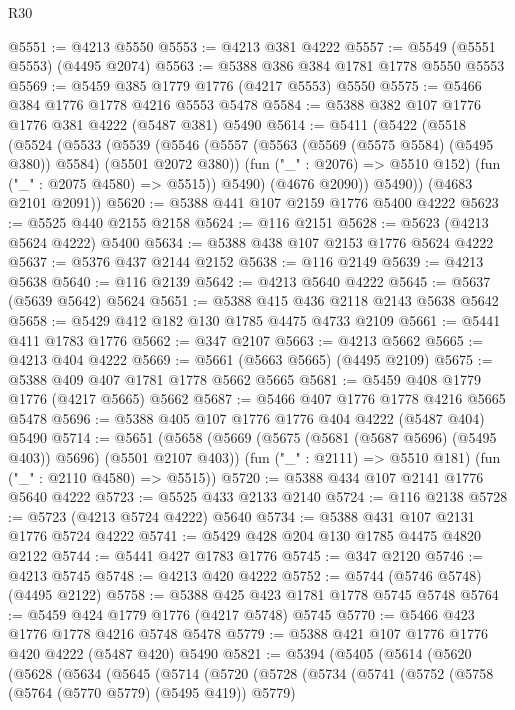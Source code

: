 \begin{lexlean}{R30}
\begin{coremodule}
{{{{{@5551 := @4213 @5550
@5553 := @4213 @381 @4222
@5557 := @5549 (@5551 @5553) (@4495 @2074)
@5563 := @5388 @386 @384 @1781 @1778 @5550 @5553
@5569 := @5459 @385 @1779 @1776 (@4217 @5553) @5550
@5575 := @5466 @384 @1776 @1778 @4216 @5553 @5478
@5584 := @5388 @382 @107 @1776 @1776 @381 @4222 (@5487 @381) @5490
@5614 := @5411
    (@5422
      (@5518
        (@5524
          (@5533
            (@5539
              (@5546
                (@5557 (@5563 (@5569 (@5575 @5584) (@5495 @380)) @5584) (@5501 @2072 @380))
                (fun ("_" : @2076) => @5510 @152)
                (fun ("_" : @2075 @4580) => @5515))
              @5490)
            (@4676 @2090))
          @5490))
      (@4683 @2101 @2091))
@5620 := @5388 @441 @107 @2159 @1776 @5400 @4222
@5623 := @5525 @440 @2155 @2158
@5624 := @116 @2151
@5628 := @5623 (@4213 @5624 @4222) @5400
@5634 := @5388 @438 @107 @2153 @1776 @5624 @4222
@5637 := @5376 @437 @2144 @2152
@5638 := @116 @2149
@5639 := @4213 @5638
@5640 := @116 @2139
@5642 := @4213 @5640 @4222
@5645 := @5637 (@5639 @5642) @5624
@5651 := @5388 @415 @436 @2118 @2143 @5638 @5642
@5658 := @5429 @412 @182 @130 @1785 @4475 @4733 @2109
@5661 := @5441 @411 @1783 @1776
@5662 := @347 @2107
@5663 := @4213 @5662
@5665 := @4213 @404 @4222
@5669 := @5661 (@5663 @5665) (@4495 @2109)
@5675 := @5388 @409 @407 @1781 @1778 @5662 @5665
@5681 := @5459 @408 @1779 @1776 (@4217 @5665) @5662
@5687 := @5466 @407 @1776 @1778 @4216 @5665 @5478
@5696 := @5388 @405 @107 @1776 @1776 @404 @4222 (@5487 @404) @5490
@5714 := @5651
    (@5658
      (@5669 (@5675 (@5681 (@5687 @5696) (@5495 @403)) @5696) (@5501 @2107 @403))
      (fun ("_" : @2111) => @5510 @181)
      (fun ("_" : @2110 @4580) => @5515))
@5720 := @5388 @434 @107 @2141 @1776 @5640 @4222
@5723 := @5525 @433 @2133 @2140
@5724 := @116 @2138
@5728 := @5723 (@4213 @5724 @4222) @5640
@5734 := @5388 @431 @107 @2131 @1776 @5724 @4222
@5741 := @5429 @428 @204 @130 @1785 @4475 @4820 @2122
@5744 := @5441 @427 @1783 @1776
@5745 := @347 @2120
@5746 := @4213 @5745
@5748 := @4213 @420 @4222
@5752 := @5744 (@5746 @5748) (@4495 @2122)
@5758 := @5388 @425 @423 @1781 @1778 @5745 @5748
@5764 := @5459 @424 @1779 @1776 (@4217 @5748) @5745
@5770 := @5466 @423 @1776 @1778 @4216 @5748 @5478
@5779 := @5388 @421 @107 @1776 @1776 @420 @4222 (@5487 @420) @5490
@5821 := @5394
    (@5405
      (@5614
        (@5620
          (@5628
            (@5634
              (@5645
                (@5714
                  (@5720
                    (@5728
                      (@5734
                        (@5741
                          (@5752
                            (@5758 (@5764 (@5770 @5779) (@5495 @419)) @5779)
}}}}}
\end{coremodule}
\end{lexlean}
